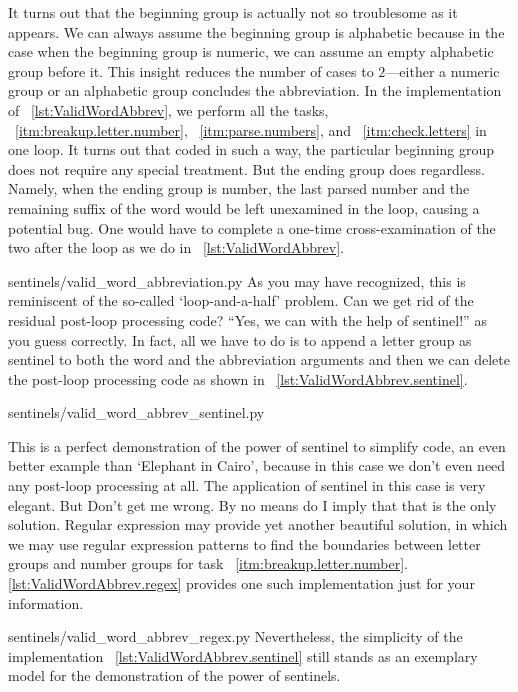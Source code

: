 It turns out that the beginning group is actually not so troublesome as it appears.
We can always assume the beginning group is alphabetic because
in the case when the beginning group is numeric, we can assume an empty alphabetic group before it.
This insight reduces the number of cases to $2$---either a numeric group or an
alphabetic group concludes the abbreviation.
In the implementation of ~\autoref{lst:ValidWordAbbrev}, we perform all the tasks,
~\autoref{itm:breakup.letter.number}, ~\autoref{itm:parse.numbers},
and ~\autoref{itm:check.letters} in one loop.
It turns out that coded in such a way, the particular beginning group does not require any special
treatment.
But the ending group does regardless.
Namely, when the ending group is number, the last parsed number and the remaining suffix of the
word would be left unexamined in the loop, causing a potential bug.
One would have to complete a one-time cross-examination of the two after the loop as we do in
~\autoref{lst:ValidWordAbbrev}.

{sentinels/valid_word_abbreviation.py}
As you may have recognized, this is reminiscent of the so-called `loop-and-a-half' problem.
Can we get rid of the residual post-loop processing code?
``Yes, we can with the help of sentinel!'' as you guess correctly.
In fact, all we have to do is to
append a letter group as sentinel to both the word and the abbreviation arguments
and then we can delete the post-loop processing code as shown in
~\autoref{lst:ValidWordAbbrev.sentinel}.

{sentinels/valid_word_abbrev_sentinel.py}

This is a perfect demonstration of the power of sentinel to simplify code,
an even better example
than `Elephant in Cairo', because in this case we don't even need any post-loop processing at all.
The application of sentinel in this case is very elegant.
But Don't get me wrong.
By no means do I imply that that is the only solution.
Regular expression may provide yet another beautiful solution, in which we may use regular
expression patterns to find the boundaries between letter groups and number groups for task
~\autoref{itm:breakup.letter.number}.
\@\autoref{lst:ValidWordAbbrev.regex} provides one such implementation just for your information.

{sentinels/valid_word_abbrev_regex.py}
Nevertheless, the simplicity of the implementation ~\autoref{lst:ValidWordAbbrev.sentinel} still
stands as an exemplary model for the demonstration of the power of sentinels.


